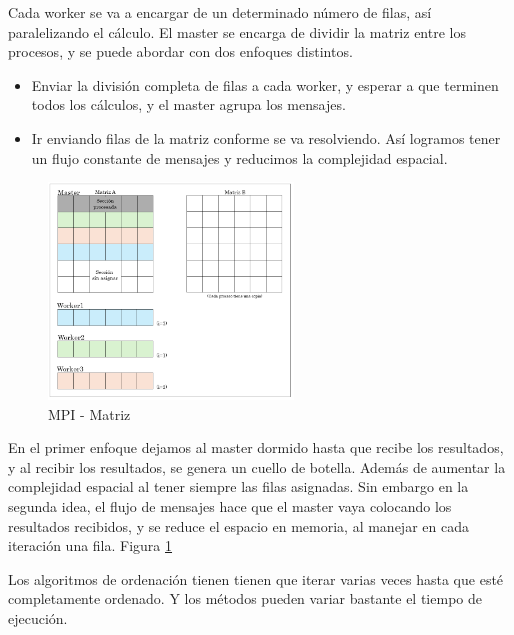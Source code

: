 	Cada worker se va a encargar de un determinado número de filas, así paralelizando el cálculo. El master se encarga de dividir la matriz entre los procesos, y se puede abordar con dos enfoques distintos.
	\begin{itemize}
		\item Enviar la división completa de filas a cada worker, y esperar a que terminen todos los cálculos, y el master agrupa los mensajes. 
		\item Ir enviando filas de la matriz conforme se va resolviendo. Así logramos tener un flujo constante de mensajes y reducimos la complejidad espacial.
	\end{itemize}



	\begin{figure}[!h]
		\centering
		\includegraphics[width=0.58\textwidth]{images/chapter_3/matriz_mpi}
		\caption{MPI - Matriz}
		\label{fig:matrizmpi}
	\end{figure}
	
	En el primer enfoque dejamos al master dormido hasta que recibe los resultados, y al recibir los resultados, se genera un cuello de botella. Además de aumentar la complejidad espacial al tener siempre las filas asignadas. Sin embargo en la segunda idea, el flujo de mensajes hace que el master vaya colocando los resultados recibidos, y se reduce el espacio en memoria, al manejar en cada iteración una fila. Figura \ref{fig:matrizmpi}


	
	
	Los algoritmos de ordenación tienen tienen que iterar varias veces hasta que esté completamente ordenado. Y los métodos pueden variar bastante el tiempo de ejecución.
	
